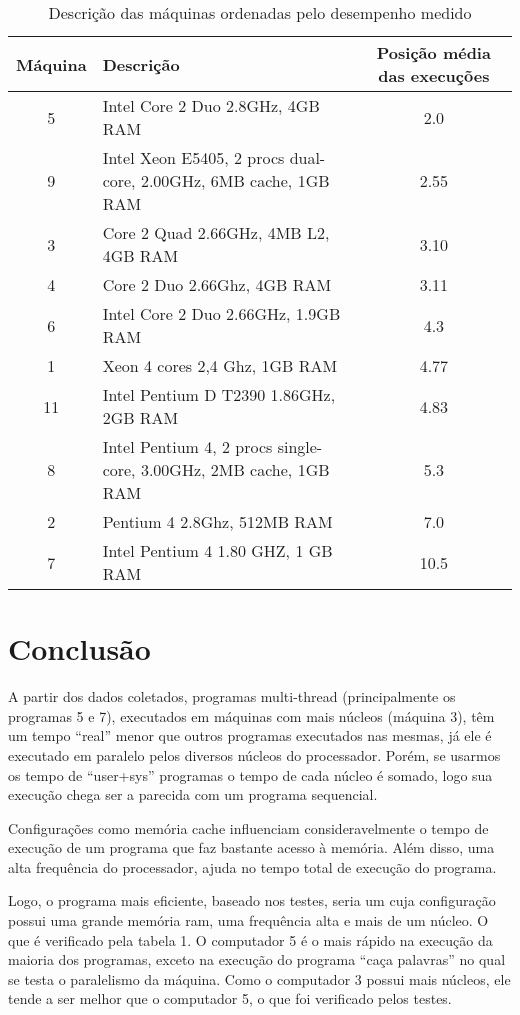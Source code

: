 \documentclass[10pt,a4paper]{article}
\begin{document}
\begin{table}[h!]
\caption{Descrição das máquinas ordenadas pelo desempenho medido}
\begin{tabular}{clc}
\hline
Máquina & Descrição & Posição média das execuções\\
\hline
5	&	Intel Core 2 Duo 2.8GHz, 4GB RAM & 2.0\\
9 &	Intel Xeon E5405, 2 procs dual-core, 2.00GHz, 6MB cache, 1GB
RAM & 2.55\\
3	&	Core 2 Quad 2.66GHz, 4MB L2, 4GB RAM & 3.10\\
4	&	Core 2 Duo 2.66Ghz, 4GB RAM & 3.11\\
6	&	Intel Core 2 Duo 2.66GHz, 1.9GB RAM & 4.3 \\
1	&	  Xeon 4 cores 2,4 Ghz, 1GB RAM & 4.77\\
11 &	Intel Pentium D T2390 1.86GHz, 2GB RAM & 4.83\\
8 &	Intel Pentium 4, 2 procs single-core, 3.00GHz, 2MB cache, 1GB
RAM & 5.3\\
2	&	Pentium 4 2.8Ghz, 512MB RAM & 7.0\\
7	&	Intel Pentium 4 1.80 GHZ, 1 GB RAM & 10.5\\
\hline
\end{tabular}
\end{table}

\vspace{-5mm}
\section{Conclusão}
A partir dos dados coletados, programas multi-thread (principalmente
os programas 5 e 7), executados em máquinas com mais núcleos (máquina 3), têm um tempo
``real'' menor que outros programas executados nas mesmas, já ele é executado em paralelo pelos
diversos núcleos do processador. Porém, se usarmos os tempo de ``user+sys''
programas o tempo de cada núcleo é somado, logo sua execução chega ser
a parecida com um programa sequencial.

Configurações como memória cache influenciam consideravelmente o tempo de
execução de um programa que faz bastante acesso à memória. Além disso,
 uma alta frequência do processador, ajuda no tempo total de execução
do programa.

Logo, o programa mais eficiente, baseado nos testes, seria um cuja
configuração possui uma grande memória ram, uma frequência alta e mais
de um núcleo. O que é verificado pela tabela 1.
 O computador 5 é o
mais rápido na execução da maioria dos programas, exceto na execução
do programa ``caça palavras'' no qual se testa o
paralelismo da máquina. Como o computador 3 possui mais núcleos, ele tende a ser
melhor que o computador 5, o que foi verificado pelos testes.
\end{document}
